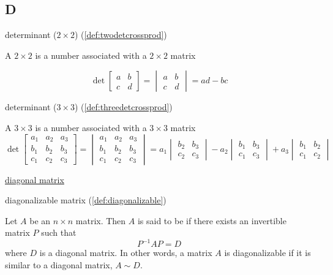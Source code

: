 \documentclass{ximera}
\begin{document}
\subsection{D}
determinant ($2\times 2$) (\ref{def:twodetcrossprod})
\begin{expandable}
    A $2\times 2$  is a number associated with a $2\times 2$ matrix

$$\det{\begin{bmatrix}
a & b\\
c & d
\end{bmatrix}}=\begin{vmatrix}
a & b\\
c & d
\end{vmatrix} =ad-bc$$
\end{expandable}

determinant ($3\times 3$) (\ref{def:threedetcrossprod})
\begin{expandable}
    A $3\times 3$  is a number associated with a $3\times 3$ matrix
$$\det{\begin{bmatrix}
a_1 & a_2 & a_3\\
b_1 & b_2 &b_3\\
c_1 &c_2 &c_3
\end{bmatrix}}=
\begin{vmatrix}
a_1 & a_2 & a_3\\
b_1 & b_2 &b_3\\
c_1 &c_2 &c_3
\end{vmatrix} =a_1
\begin{vmatrix}
b_2 & b_3\\
c_2 & c_3
\end{vmatrix} -a_2
\begin{vmatrix}
b_1 & b_3\\
c_1 & c_3
\end{vmatrix} +a_3
\begin{vmatrix}
b_1 & b_2\\
c_1 & c_2
\end{vmatrix}
$$
\end{expandable}

\href{https://ximera.osu.edu/oerlinalg/LinearAlgebra/MAT-0025/main}{diagonal matrix}

diagonalizable matrix (\ref{def:diagonalizable})
\begin{expandable}
    Let $A$ be an $n\times n$ matrix. Then $A$ is said to be  if there exists an invertible matrix $P$ such that
\begin{equation*}
P^{-1}AP=D
\end{equation*}
where $D$ is a diagonal matrix.  In other words, a matrix $A$ is diagonalizable if it is similar to a diagonal matrix, $A \sim D$.
\end{expandable}
\end{document}
